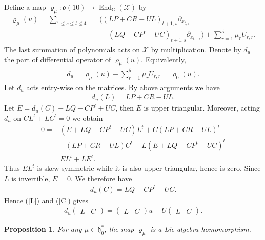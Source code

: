 \documentclass[12pt]{article}
\numberwithin{equation}{section}
\newtheorem{proposition}[theorem]{Proposition}
\theoremstyle{definition}
\theoremstyle{remark}
\begin{document}
Define a map $\varrho_{\mu}:\mathfrak{o}(10)\longrightarrow\operatorname{End}_{\mathbb{C}}(\mathscr{X})$ by
\begin{eqnarray}\label{2.11}
	\varrho_{\mu}(u)=\sum_{1\leqslant s\leqslant t\leqslant 4}\!\!&\!\!\!\!&\!\!((LP+CR-UL)_{t+1,s}\partial_{x_{t,s}}\nonumber\\
	\!\!&\!\!\!\!&\!\!+(LQ-CP^t-UC)_{t+1,s}\partial_{x_{t,-s}})+\sum_{r=1}^5\mu_rU_{r,r}.\label{rho}
\end{eqnarray}
The last summation of polynomials acts on $\mathscr{X}$ by multiplication. Denote by $d_u$ the part of differential operator of $\varrho_{\mu}(u)$. Equivalently,
\begin{eqnarray}
	d_u=\varrho_{\mu}(u)-\sum_{r=1}^5\mu_rU_{r,r}=\varrho_0(u).
\end{eqnarray}
Let $d_u$ acts entry-wise on the matrices. By above arguments we have
\begin{eqnarray}
	d_u(L)=LP+CR-UL. \label{L}
\end{eqnarray}
Let $E=d_u(C)-LQ+CP^t+UC$, then $E$ is upper triangular. Moreover, acting $d_u$ on $CL^t+LC^t=0$ we obtain
\begin{align}
	0=&(E+LQ-CP^t-UC)L^t+C(LP+CR-UL)^t\nonumber\\
	 &+(LP+CR-UL)C^t+L(E+LQ-CP^t-UC)^t\nonumber\\
	 =&EL^t+LE^t.
\end{align}
Thus $EL^t$ is skew-symmetric while it is also upper triangular, hence is zero. Since $L$ is invertible, $E=0$. We therefore have
\begin{eqnarray}
	d_u(C)=LQ-CP^t-UC. \label{C}
\end{eqnarray}
Hence (\ref{L}) and (\ref{C}) gives
\begin{eqnarray}
	d_u\begin{pmatrix}
		L&C
	\end{pmatrix}=\begin{pmatrix}
	L&C
	\end{pmatrix}u-U\begin{pmatrix}
	L&C
	\end{pmatrix}. \label{LC}
\end{eqnarray}
\begin{proposition}
	For any $\mu\in\mathfrak{h}_0^*$, the map $\varrho_\mu$ is a Lie algebra homomorphism.
\end{proposition}
\end{document}
